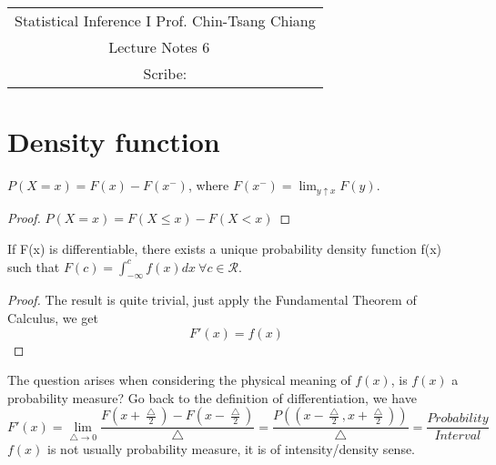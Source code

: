 \documentclass[../Probability_Theory.tex]{subfiles}
\begin{document}
	\begin{center}
		\renewcommand{\arraystretch}{2}
		\begin{bfseries}
			\begin{tabular}{|c|}
				\hline
				Statistical Inference I \hfill Prof. Chin-Tsang Chiang\\
				\hspace{15em} {\large Lecture Notes 6} \hspace{15em}\ \\
				\lecdate \hfill Scribe: \scribe\\
				\hline
			\end{tabular}
			\renewcommand{\arraystretch}{1}
		\end{bfseries}
	\end{center}


\section{Density function}
\begin{theorem}
$P(X=x)=F(x)-F(x^-)$, where $F(x^-)=\lim_{y\uparrow x}F(y).$
\end{theorem}
\begin{proof}
$P(X=x)=F(X\leq x)-F(X<x)$
\end{proof}
\begin{theorem}
If F(x) is differentiable, there exists a unique probability density function f(x) such that $F(c)=\int_{-\infty}^c f(x)dx\ \forall c\in \mathcal{R}.$  
\end{theorem}
\begin{proof}
The result is quite trivial, just apply the Fundamental Theorem of Calculus, we get $$F'(x)=f(x)$$ 
\end{proof}
The question arises when considering the physical meaning of $f(x)$, is $f(x)$ a probability measure? Go back to the definition of differentiation, we have
$$F'(x)=\lim_{\bigtriangleup\rightarrow 0}\frac{F(x+\frac{\bigtriangleup}{2})-F(x-\frac{\bigtriangleup}{2})}{\bigtriangleup}=\frac{P((x-\frac{\bigtriangleup}{2},x+\frac{\bigtriangleup}{2}))}{\bigtriangleup}=\frac{Probability}{Interval}$$ 
$f(x)$ is not usually probability measure, it is of intensity/density sense.
\end{document}
